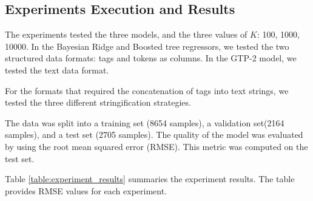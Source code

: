 \documentclass[sn-mathphys]{sn-jnl}%
\theoremstyle{thmstyleone}%
\theoremstyle{thmstyletwo}%
\theoremstyle{thmstylethree}%
\begin{document}
\subsection{Experiments Execution and Results}

The experiments tested the three models, and the three values of $K$: \num{100}, \num{1000}, \num{10000}.
In the Bayesian Ridge and Boosted tree regressors, we tested the two structured data formats: tags and tokens as columns.
In the GTP-2 model, we tested the text data format.

For the formats that required the concatenation of tags into text strings, we tested the three different stringification strategies.

The data was split into a training set (\num{8654} samples), a validation set(\num{2164} samples), and a test set (\num{2705} samples).
The quality of the model was evaluated by using the root mean squared error (RMSE).
This metric was computed on the test set.

Table \ref{table:experiment_results} summaries the experiment results.
The table provides RMSE values for each experiment.



\end{document}
